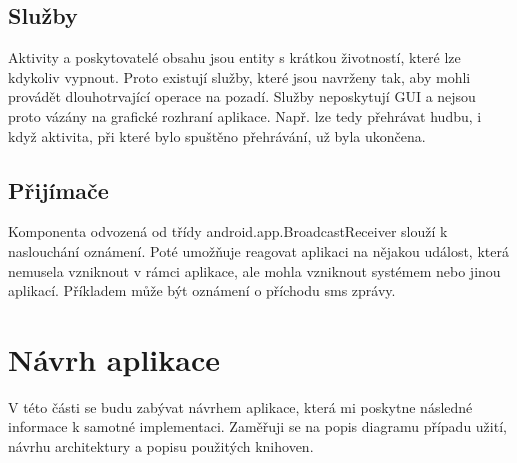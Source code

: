 \documentclass[12pt]{article}
\begin{document}
\subsection{Služby}
Aktivity a poskytovatelé obsahu jsou entity s krátkou životností, které lze kdykoliv vypnout. Proto existují služby, které jsou navrženy tak, aby mohli provádět dlouhotrvající operace na pozadí. Služby neposkytují GUI a nejsou proto vázány na grafické rozhraní aplikace. Např. lze tedy přehrávat hudbu, i když aktivita, při které bylo spuštěno přehrávání, už byla ukončena.
\subsection{Přijímače}
Komponenta odvozená od třídy android.app.BroadcastReceiver slouží k naslouchání oznámení. Poté umožňuje reagovat aplikaci na nějakou událost, která nemusela vzniknout v rámci aplikace, ale mohla vzniknout systémem nebo jinou aplikací. Příkladem může být oznámení o příchodu sms zprávy.

\section{Návrh aplikace}
V této části se budu zabývat návrhem aplikace, která mi poskytne následné informace k samotné implementaci. Zaměřuji se na popis diagramu případu užití, návrhu architektury a popisu použitých knihoven.
\end{document}
